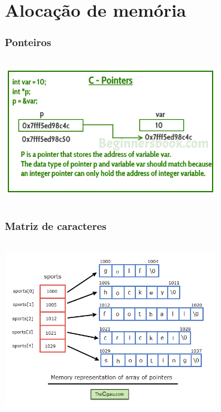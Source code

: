 \documentclass[xcolor={usenames,dvipsnames},10pt,compress,aspectratio=169]{beamer}
\begin{document}
\section{Alocação de memória}
\begin{frame}[fragile]
  \frametitle{Ponteiros}
  \begin{columns}
    \begin{column}{\textwidth}
      \begin{center}
    \includegraphics[width=0.7\textwidth]{pointer_memory_representation}
      \end{center}
    \end{column}
  \end{columns}
\end{frame}
\begin{frame}[fragile]
  \frametitle{Matriz de caracteres}
  \begin{columns}
    \begin{column}{\textwidth}
      \begin{center}
    \includegraphics[width=0.7\textwidth]{C2Darray}
      \end{center}
    \end{column}
  \end{columns}
\end{frame}
\end{document}
